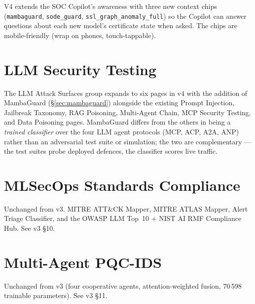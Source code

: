 \documentclass[11pt,a4paper]{article}
\begin{document}
V4 extends the SOC Copilot's awareness with three new context chips
(\texttt{mambaguard}, \texttt{sode\_guard},
\texttt{ssl\_graph\_anomaly\_full}) so the Copilot can answer
questions about each new model's certificate state when asked.  The
chips are mobile-friendly (wrap on phones, touch-tappable).

\section{LLM Security Testing}
\label{sec:llm_security}

The LLM Attack Surfaces group expands to six pages in v4 with the
addition of MambaGuard (\S\ref{sec:mambaguard}) alongside the existing
Prompt Injection, Jailbreak Taxonomy, RAG Poisoning, Multi-Agent
Chain, MCP Security Testing, and Data Poisoning pages.  MambaGuard
differs from the others in being a \emph{trained classifier} over
the four LLM agent protocols (MCP, ACP, A2A, ANP) rather than an
adversarial test suite or simulation; the two are complementary --- the
test suites probe deployed defences, the classifier scores live
traffic.

\section{MLSecOps Standards Compliance}
\label{sec:mlsecops}

Unchanged from v3.  MITRE ATT\&CK Mapper, MITRE ATLAS Mapper, Alert
Triage Classifier, and the OWASP LLM Top~10 + NIST AI RMF
Compliance Hub.  See v3 \S10.

\section{Multi-Agent PQC-IDS}
\label{sec:pqc_ids}

Unchanged from v3 (four cooperative agents, attention-weighted
fusion, 70\,598 trainable parameters).  See v3 \S11.

\end{document}
